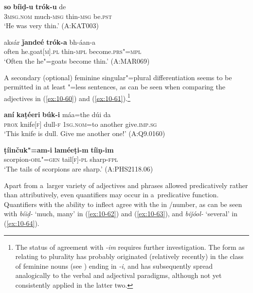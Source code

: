 \begin{exe}
\ex
\label{ex:10-58}
\gll {\ob}\textbf{so}{\cb} {\ob}\textbf{bíiḍ-u} \textbf{trók-u}{\cb} de \\
\textsc{3msg.nom} much-\textsc{msg} thin-\textsc{msg} be.\textsc{pst} \\
\glt `He was very thin.' (A:KAT003)

\ex
\label{ex:10-59}
\gll aksár {\ob}\textbf{ǰandeé}{\cb} {\ob}\textbf{trók-a}{\cb} bh-áan-a \\
often he.goat[\textsc{m}].\textsc{pl} thin-\textsc{mpl} become.\textsc{prs"=mpl} \\
\glt `Often the he"=goats become thin.' (A:MAR069)
\end{exe}


A secondary (optional) feminine singular"=plural  differentiation seems to be permitted in at least "=less sentences, as can be seen when comparing the adjectives in (\ref{ex:10-60}) and (\ref{ex:10-61}).\footnote{The status of agreement with \textit{-im} requires further investigation. The form as relating to plurality has probably originated (relatively recently) in the class of feminine nouns (see ) ending in \textit{-i}, and has subsequently spread analogically to the verbal and adjectival paradigms, although not yet consistently applied in the latter two.}

\begin{exe}
\ex
\label{ex:10-60}
\gll {\ob}\textbf{aní} \textbf{kaṭéeri}{\cb} {\ob}\textbf{búk-i}{\cb} máa=the dúi da \\
\textsc{prox} knife[\textsc{f}] dull-\textsc{f} \textsc{1sg.nom=}to another give.\textsc{imp.sg} \\
\glt `This knife is dull. Give me another one!' (A:Q9.0160)

\ex
\label{ex:10-61}
\gll {\ob}\textbf{ṭíinčuk"=am-i} \textbf{laméeṭi-m}{\cb} {\ob}\textbf{tíiṇ-im}{\cb} \\ 
scorpion-\textsc{obl"=gen} tail[\textsc{f}]-\textsc{pl } sharp-\textsc{fpl} \\
\glt `The tails of scorpions are sharp.' (A:PHS2118.06)
\end{exe}

Apart from a~larger variety of adjectives and  phrases allowed predicatively rather than attributively, even quantifiers may occur in a~predicative function. Quantifiers with the ability to inflect agree with the    in /number, as can be seen with \textit{bíiḍ-} `much, many' in (\ref{ex:10-62}) and (\ref{ex:10-63}), and \textit{biǰóol-} `several' in (\ref{ex:10-64}).

